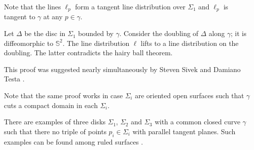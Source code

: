 Note that the lines $\ell_p$ form a tangent line distribution over $\Sigma_1$
and $\ell_p$ is tangent to $\gamma$ at any $p\in\gamma$.

Let $\Delta$ be the disc in $\Sigma_1$ bounded by $\gamma$.
Consider the doubling of $\Delta$ along  $\gamma$;
it is diffeomorphic to $\mathbb S^2$.
The line distribution $\ell$ lifts to a line distribution on the doubling.
The latter contradicts the hairy ball theorem.\qeds


This proof was suggested nearly simultaneously 
by Steven Sivek 
and Damiano Testa \cite[see][]{two-discs}.

Note that the same proof works in case $\Sigma_i$ are oriented open surfaces such that $\gamma$ cuts a compact domain in each $\Sigma_i$.

There are examples of three disks $\Sigma_1$, $\Sigma_2$ and $\Sigma_3$
with a common closed curve $\gamma$ such that there 
no triple of points $p_i\in\Sigma_i$ with parallel tangent planes.
Such examples can be found among ruled surfaces \cite[see][]{three-discs}.